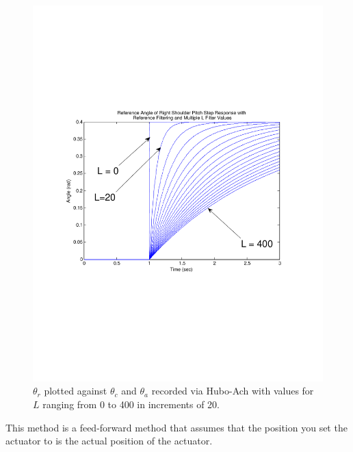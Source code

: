 \begin{figure}[thpb]
  \centering
\includegraphics[width=0.8\columnwidth]{./throwGraph/LPlot.pdf}
  \caption{$\theta_r$ plotted against $\theta_c$ and $\theta_a$ recorded via Hubo-Ach with values for $L$ ranging from 0 to 400 in increments of 20.}
  \label{fig:singleJointStepFilteredLtest}
\end{figure}

This method is a feed-forward method that assumes that the position you set the actuator to is the actual position of the actuator.
